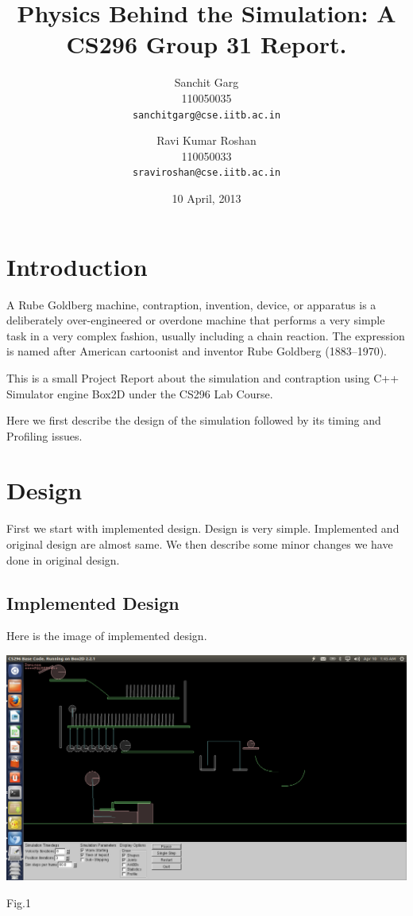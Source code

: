 \documentclass[a4paper,11pt]{article}
\begin{document}
\title{Physics Behind the Simulation: A CS296 Group 31 Report.}

\author{Sanchit Garg\\ 110050035\\	\texttt{sanchitgarg@cse.iitb.ac.in} \and
		Ravi Kumar Roshan\\ 110050033\\ \texttt{sraviroshan@cse.iitb.ac.in}
		}

\date{10 April, 2013}

\maketitle


\section{Introduction}
A Rube Goldberg machine, contraption, invention, device, or apparatus is a deliberately over-engineered or overdone machine that performs a very simple task in a very complex fashion, usually including a chain reaction. The expression is named after American cartoonist and inventor Rube Goldberg (1883–1970). ~\cite{wiki}

This is a small Project Report about the simulation and contraption using C++ Simulator engine Box2D under the CS296 Lab Course.

Here we first describe the design of the simulation followed by its timing and Profiling issues.

\section{Design}
First we start with implemented design. Design is very simple. Implemented and original design are almost same. We then describe some minor changes we have done in original design.~\cite{lt}
\subsection{Implemented Design}	
Here is the image of implemented design.
\begin{center}
\includegraphics[scale=0.3]{./doc/photo1.png}
\begin{center}
Fig.1
\end{center}
\end{center}
\end{document}
